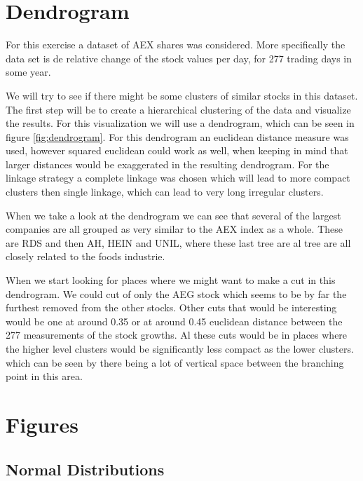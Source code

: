 \documentclass[10pt,a4paper]{article}
\begin{document}
\section{Dendrogram}
For this exercise a dataset of AEX shares was considered. More specifically the data set is de relative change of the stock values per day, for 277 trading days in some year. 

We will try to see if there might be some clusters of similar stocks in this dataset. The first step will be to create a hierarchical clustering of the data and visualize the results. For this visualization we will use a dendrogram, which can be seen in figure \autoref{fig:dendrogram}. For this dendrogram an euclidean distance measure was used, however squared euclidean could work as well, when keeping in mind that larger distances would be exaggerated in the resulting dendrogram. For the linkage strategy a complete linkage was chosen which will lead to more compact clusters then single linkage, which can lead to very long irregular clusters.

When we take a look at the dendrogram we can see that several of the largest companies are all grouped as very similar to the AEX index as a whole. These are RDS and then AH, HEIN and UNIL, where these last tree are al tree are all closely related to the foods industrie. 

When we start looking for places where we might want to make a cut in this dendrogram. We could cut of only the AEG stock which seems to be by far the furthest removed from the other stocks. Other cuts that would be interesting would be one at around 0.35 or at around 0.45 euclidean distance between the 277 measurements of the stock growths. Al these cuts would be in places where the higher level clusters would be significantly less compact as the lower clusters. which can be seen by there being a lot of vertical space between the branching point in this area. 

\appendix
\section{Figures}
\subsection{Normal Distributions}
\end{document}
